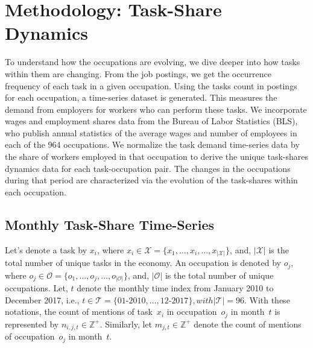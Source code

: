 \documentclass[letterpaper]{article} %
\begin{document}
\section{Methodology: Task-Share Dynamics}
\label{sec:methods}
To understand how the occupations are evolving, we dive deeper into how tasks within them are changing. From the job postings, we get the occurrence frequency of each task in a given occupation. Using the tasks count in postings for each occupation, a time-series dataset is generated. This measures the demand from employers for workers who can perform these tasks. We incorporate wages and employment shares data from the Bureau of Labor Statistics (BLS), who publish annual statistics of the average wages and number of employees in each of the 964 occupations. We normalize the task demand time-series data by the share of workers employed in that occupation to derive the unique task-shares dynamics data for each task-occupation pair. The changes in the occupations during that period are characterized via the evolution of the task-shares within each occupation.

\subsection{Monthly Task-Share Time-Series}
\label{subsec:monthly_taskshare}
Let's denote a task by $x_i$, where $x_i \in \mathcal{X} = \{ x_1, \hdots, x_i, \hdots, x_{|\mathcal{X}|}\}$, and, $|\mathcal{X}|$ is the total number of unique tasks in the economy. An occupation is denoted by $o_j$, where $o_j \in \mathcal{O} = \{ o_1, \hdots, o_j, \hdots, o_{|\mathcal{O}|}\}$, and, $|\mathcal{O}|$ is the total number of unique occupations. Let, $t$ denote the monthly time index from January 2010 to December 2017, i.e., $t \in \mathcal{T} = \{ 01\text{-}2010, \hdots, 12\text{-}2017 \}, with |\mathcal{T}|=96 $. With these notations, the count of mentions of task~$x_i$ in occupation~$o_j$ in month~$t$ is represented by $n_{i,j,t} \in \mathbb{Z}^{+}$. Similarly, let $m_{j,t} \in \mathbb{Z}^{+}$ denote the count of mentions of occupation~$o_j$ in month~$t$.
\end{document}

